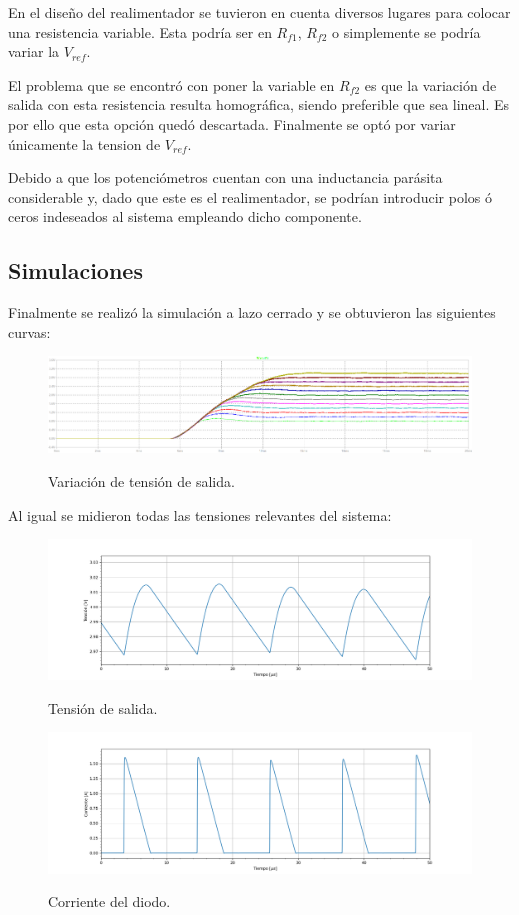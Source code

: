 En el diseño del realimentador se tuvieron en cuenta diversos lugares para colocar una resistencia variable. Esta podría ser en $R_{f1}$, $R_{f2}$ o simplemente se podría variar la $V_{ref}$.

El problema que se encontró con poner la variable en $R_{f2}$ es que la variación de salida con esta resistencia resulta homográfica, siendo preferible que sea lineal. Es por ello que esta opción quedó descartada. Finalmente se optó por variar únicamente la tension de $V_{ref}$.

Debido a que los potenciómetros cuentan con una inductancia parásita considerable y, dado que este es el realimentador, se podrían introducir polos ó ceros indeseados al sistema empleando dicho componente.
 \subsection{Simulaciones}
Finalmente se realizó la simulación a lazo cerrado y se obtuvieron las siguientes curvas:

\begin{figure}[H]
	\centering
	\includegraphics[width=0.9\linewidth]{ImagenesParteIII/Vouts.png}
	\label{fig:vouts_3}
	\caption{Variación de tensión de salida.}
\end{figure}
Al igual se midieron todas las tensiones relevantes del sistema:
\begin{figure}[H]
	\centering
	\includegraphics[width=\linewidth]{ImagenesParteIII/ Vo.png}
	\label{fig:vo}
	\caption{Tensión de salida.}
\end{figure}

\begin{figure}[H]
	\centering
	\includegraphics[width=\linewidth]{ImagenesParteIII/Idiodo.png}
	\label{fig:idiodo}
	\caption{Corriente del diodo.}
\end{figure}

